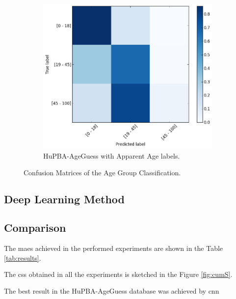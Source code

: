 \begin{figure}[!h]
	\begin{subfigure}[b]{0.5\textwidth}
		\includegraphics[width=\textwidth]{figures/FG-NETconf_mat}
		\caption{HuPBA-AgeGuess with Apparent Age labels.}
		\label{fig:cmapp}
	\end{subfigure}
	\caption{Confusion Matrices of the Age Group Classification.}\label{fig:cm}
\end{figure}

\subsection{Deep Learning Method}

\subsection{Comparison}


The \glspl{mae} achieved in the performed experiments are shown in the Table \ref{tab:results}.

The \glspl{cs} obtained in all the experiments is sketched in the Figure \ref{fig:cumS}.

The best result in the HuPBA-AgeGuess database was achieved by \gls{cnn}


